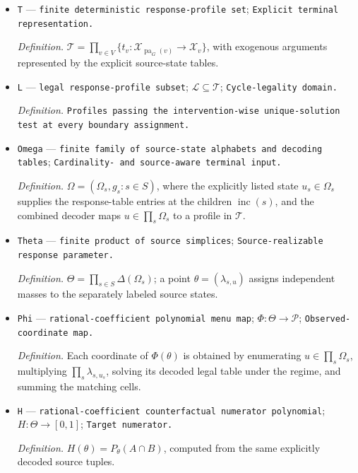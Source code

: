 \documentclass{article}
\begin{document}
\begin{itemize}
  \item \texttt{T} --- \texttt{finite deterministic response-\allowbreak{}profile set}; \texttt{Explicit terminal representation.}
  \par\smallskip\noindent\emph{Definition.} \(\mathcal T=\prod_{v\in V}\{t_v:\mathcal X_{\operatorname{pa}_G(v)}\to\mathcal X_v\}\), with exogenous arguments represented by the explicit source-state tables.
  \item \texttt{L} --- \texttt{legal response-\allowbreak{}profile subset}; \(\mathcal L\subseteq\mathcal T\); \texttt{Cycle-\allowbreak{}legality domain.}
  \par\smallskip\noindent\emph{Definition.} \texttt{Profiles passing the intervention-\allowbreak{}wise unique-\allowbreak{}solution test at every boundary assignment.}
  \item \texttt{Omega} --- \texttt{finite family of source-\allowbreak{}state alphabets and decoding tables}; \texttt{Cardinality-\allowbreak{} and source-\allowbreak{}aware terminal input.}
  \par\smallskip\noindent\emph{Definition.} \(\Omega=(\Omega_s,g_s:s\in S)\), where the explicitly listed state \(u_s\in\Omega_s\) supplies the response-table entries at the children \(\operatorname{inc}(s)\), and the combined decoder maps \(u\in\prod_s\Omega_s\) to a profile in \(\mathcal T\).
  \item \texttt{Theta} --- \texttt{finite product of source simplices}; \texttt{Source-\allowbreak{}realizable response parameter.}
  \par\smallskip\noindent\emph{Definition.} \(\Theta=\prod_{s\in S}\Delta(\Omega_s)\); a point \(\theta=(\lambda_{s,u})\) assigns independent masses to the separately labeled source states.
  \item \texttt{Phi} --- \texttt{rational-\allowbreak{}coefficient polynomial menu map}; \(\Phi:\Theta\to\mathcal P\); \texttt{Observed-\allowbreak{}coordinate map.}
  \par\smallskip\noindent\emph{Definition.} Each coordinate of \(\Phi(\theta)\) is obtained by enumerating \(u\in\prod_s\Omega_s\), multiplying \(\prod_s\lambda_{s,u_s}\), solving its decoded legal table under the regime, and summing the matching cells.
  \item \texttt{H} --- \texttt{rational-\allowbreak{}coefficient counterfactual numerator polynomial}; \(H:\Theta\to[0,1]\); \texttt{Target numerator.}
  \par\smallskip\noindent\emph{Definition.} \(H(\theta)=P_\theta(A\cap B)\), computed from the same explicitly decoded source tuples.

\end{itemize}
\end{document}
